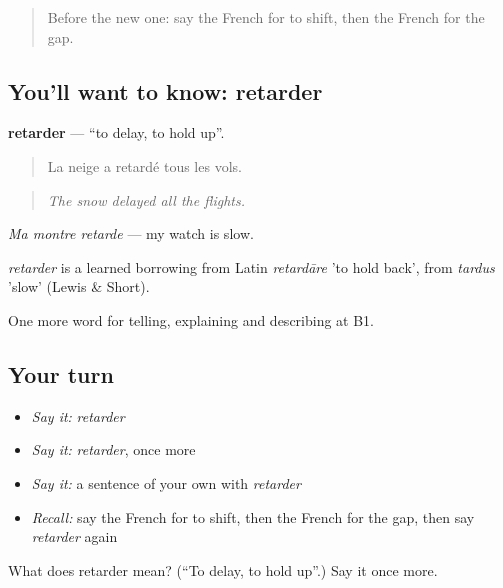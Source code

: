 \label{lesson:FR-C420-retarder}



\begin{quote}
Before the new one: say the French for to shift, then the French for the gap.
\end{quote}

\subsection*{You'll want to know: retarder}
\textbf{retarder} — \textquotedblleft{}to delay, to hold up\textquotedblright{}.

\begin{quote}
La neige a retardé tous les vols.
\end{quote}

\begin{quote}
\emph{The snow delayed all the flights.}
\end{quote}

\emph{Ma montre retarde} — my watch is slow.

\begin{cousinweb}
\emph{retarder} is a learned borrowing from Latin \emph{retardāre} 'to hold back', from \emph{tardus} 'slow' (Lewis \& Short).
\end{cousinweb}

\begin{grammarlens}[title={What you've built}]
One more word for telling, explaining and describing at B1.
\end{grammarlens}

\subsection*{Your turn}
\begin{itemize}
\raggedright
  \item \emph{Say it:} \emph{retarder}
  \item \emph{Say it:} \emph{retarder}, once more
  \item \emph{Say it:} a sentence of your own with \emph{retarder}
  \item \emph{Recall:} say the French for to shift, then the French for the gap, then say \emph{retarder} again
\end{itemize}

\begin{tcolorbox}[breakable,colback=teal!4,colframe=teal!35!black,title={Before you move on}]
What does retarder mean? (\textquotedblleft{}To delay, to hold up\textquotedblright{}.) Say it once more.
\end{tcolorbox}
